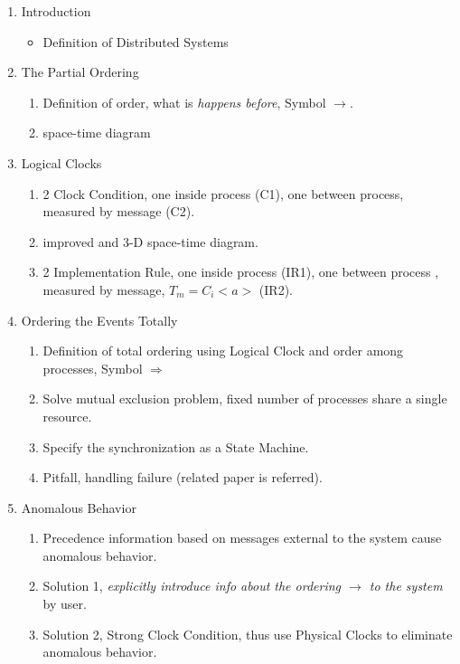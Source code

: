 \documentclass[12pt,a4paper,oneside]{article}
\begin{document}
\begin{enumerate}
  \item Introduction
  \begin{itemize}
    \item Definition of Distributed Systems
  \end{itemize}
  \item The Partial Ordering
  \begin{enumerate}
      \item Definition of order, what is \textit{happens before}, Symbol $\rightarrow$. %
      \item space-time diagram
  \end{enumerate}
  \item Logical Clocks
  \begin{enumerate}
      \item 2 Clock Condition, one inside process (C1), one between process, measured by message (C2).
      \item improved and 3-D space-time diagram.
      \item 2 Implementation Rule, one inside process (IR1), one between process , measured by message, $T_m = C_i<a>$ (IR2).
  \end{enumerate}
  \item Ordering the Events Totally
  \begin{enumerate}
      \item Definition of total ordering using Logical Clock and order among processes, Symbol $\Rightarrow$
      \item Solve mutual exclusion problem, fixed number of processes share a single resource.
      \item Specify the synchronization as a State Machine.
      \item Pitfall, handling failure (related paper is referred).
  \end{enumerate}
  \item Anomalous Behavior
  \begin{enumerate}
      \item Precedence information based on messages external to the system cause anomalous behavior.
      \item Solution 1, \textit{explicitly introduce info about the ordering $\rightarrow$ to the system} by user.
      \item Solution 2, Strong Clock Condition, thus use Physical Clocks to eliminate anomalous behavior.

\end{enumerate}
\end{enumerate}
\end{document}
